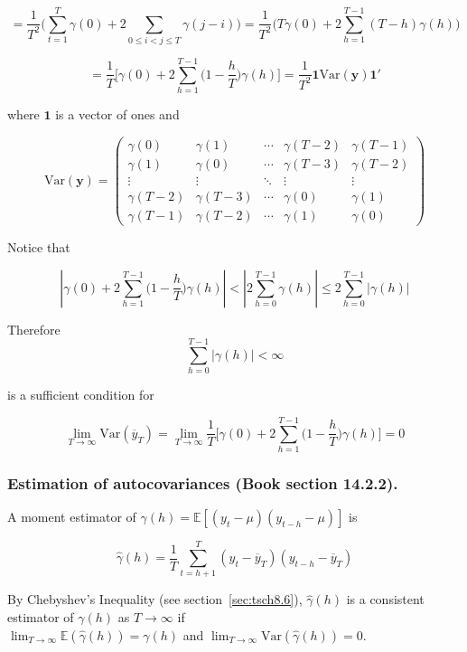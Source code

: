 \documentclass{article}
\newcommand{\E}{\mathbb{E}}
\newcommand{\Var}{\mathrm{Var}}
\begin{document}
\[
= \frac{1}{T^2} \bigg(\sum_{t=1}^T  \gamma(0) + 2 \sum_{0 \leq i < j \leq T } \gamma(j-i)  \bigg) = \frac{1}{T^2} \bigg( T  \gamma(0) + 2 \sum_{h = 1 }^{T-1} (T - h )\gamma(h)  \bigg)
\]

\[
= \frac{1}{T} \bigg[ \gamma(0) + 2 \sum_{h=1}^{T-1} \bigg(1 - \frac{h}{T} \bigg) \gamma(h) \bigg] = \frac{1}{T^2} \boldsymbol{1} \Var(\boldsymbol{y}) \boldsymbol{1}'
\]

where \(\boldsymbol{1}\) is a vector of ones and

\[
\Var(\boldsymbol{y}) = \begin{pmatrix} 
\gamma(0) &  \gamma(1) & \cdots  &  \gamma(T-2) & \gamma(T-1) \\
\gamma(1) &  \gamma(0) & \cdots  &  \gamma(T-3) & \gamma(T-2) \\
\vdots &  \vdots & \ddots  &  \vdots & \vdots \\
\gamma(T - 2) &  \gamma(T - 3) & \cdots  &  \gamma(0) & \gamma(1) \\
\gamma(T - 1) &  \gamma(T - 2) & \cdots  &  \gamma(1) & \gamma(0) 
\end{pmatrix} 
\]

Notice that

\[
\left| \gamma(0) + 2 \sum_{h=1}^{T-1} \bigg(1 - \frac{h}{T} \bigg) \gamma(h)  \right| < \left| 2 \sum_{h=0}^{T-1}\gamma(h) \right| \leq 2 \sum_{h=0}^{T-1} \left|  \gamma(h) \right| 
\]

Therefore
\[
\sum_{h=0}^{T-1} \left|  \gamma(h) \right| < \infty
\]

is a sufficient condition for 

\[
\lim_{T \to \infty} \Var(\overline{y}_T) = \lim_{T \to \infty}  \frac{1}{T} \bigg[ \gamma(0) + 2 \sum_{h=1}^{T-1} \bigg(1 - \frac{h}{T} \bigg) \gamma(h) \bigg]  = 0
\]

\subsubsection{Estimation of autocovariances (Book section 14.2.2).} A moment estimator of \(\gamma(h) =  \E[(y_t - \mu)(y_{t-h} - \mu)]\) is

\[
\hat{\gamma}(h) = \frac{1}{T} \sum_{t=h+1}^T(y_t - \overline{y}_T)(y_{t-h} - \overline{y}_T)
\]

By Chebyshev's Inequality (see section~\ref{sec:tsch8.6}), \(\hat{\gamma}(h) \) is a consistent estimator of \(\gamma(h)\) as \(T \to \infty\) if \\ \(\lim_{T \to \infty} \E(\hat{\gamma}(h)) = \gamma(h)\) and \(\lim_{T \to \infty} \Var(\hat{\gamma}(h)) = 0\).
\end{document}
